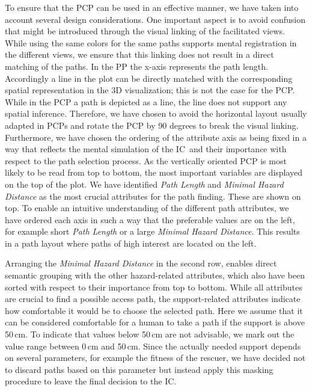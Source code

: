 \documentclass[conference,10pt,letter]{IEEEtran}
\def\IC{IC}
\begin{document}
To ensure that the PCP can be used in an effective manner, we have taken into account several design considerations. One important aspect is to avoid confusion that might be introduced through the visual linking of the facilitated views. While using the same colors for the same paths supports mental registration in the different views, we ensure that this linking does not result in a direct matching of the paths. In the PP the x-axis represents the path length. Accordingly a line in the plot can be directly matched with the corresponding spatial representation in the 3D visualization; this is not the case for the PCP. While in the PCP a path is depicted as a line, the line does not support any spatial inference. Therefore, we have chosen to avoid the horizontal layout usually adapted in PCPs and rotate the PCP by 90 degrees to break the visual linking. Furthermore, we have chosen the ordering of the attribute axis as being fixed in a way that reflects the mental simulation of the \IC\ and their importance with respect to the path selection process. As the vertically oriented PCP is most likely to be read from top to bottom, the most important variables are displayed on the top of the plot. We have identified \emph{Path Length} and \emph{Minimal Hazard Distance} as the most crucial attributes for the path finding. These are shown on top. To enable an intuitive understanding of the different path attributes, we have ordered each axis in such a way that the preferable values are on the left, for example short \emph{Path Length} or a large \emph{Minimal Hazard Distance}. This results in a path layout where paths of high interest are located on the left.

Arranging the \emph{Minimal Hazard Distance} in the second row, enables direct semantic grouping with the other hazard-related attributes, which also have been sorted with respect to their importance from top to bottom. While all attributes are crucial to find a possible access path, the support-related attributes indicate how comfortable it would be to choose the selected path. Here we assume that it can be considered comfortable for a human to take a path if the support is above 50\,cm. To indicate that values below 50\,cm are not advisable, we mark out the value range between 0\,cm and 50\,cm. Since the actually needed support depends on several parameters, for example the fitness of the rescuer, we have decided not to discard paths based on this parameter but instead apply this masking procedure to leave the final decision to the \IC .
\end{document}

